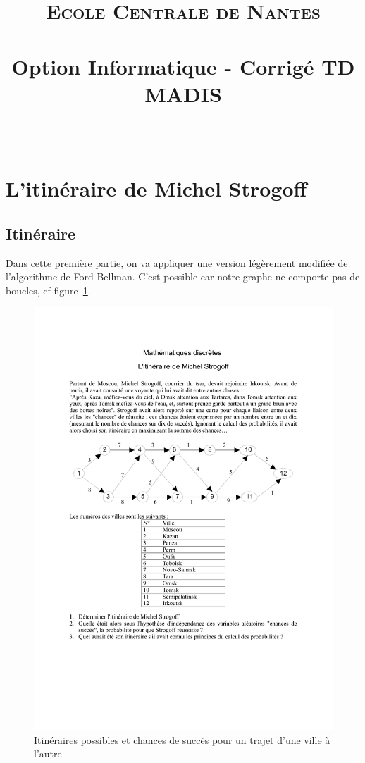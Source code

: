 \documentclass[paper=a4, fontsize=11pt]{scrartcl} %
\title{	
\normalfont \normalsize 
\textsc{Ecole Centrale de Nantes} \\ [25pt] %
\horrule{0.5pt} \\[0.4cm] %
\huge Option Informatique - Corrigé TD MADIS \\ %
\horrule{2pt} \\[0.5cm] %
}
\numberwithin{equation}{section} %
\numberwithin{figure}{section} %
\numberwithin{table}{section} %
\begin{document}
\maketitle %

\section{L'itinéraire de Michel Strogoff}

\subsection{Itinéraire}

Dans cette première partie, on va appliquer une version légèrement modifiée de l'algorithme de Ford-Bellman. C'est possible car notre graphe ne comporte pas de boucles, cf figure~\ref{fig:ms}.

\begin{figure}[htbp]
\begin{center}
	\includegraphics[width=.8\textwidth]{strogoff.pdf}
	\caption{Itinéraires possibles et chances de succès pour un trajet d'une ville à l'autre}
	\label{fig:ms}
\end{center}
\end{figure}
\end{document}
